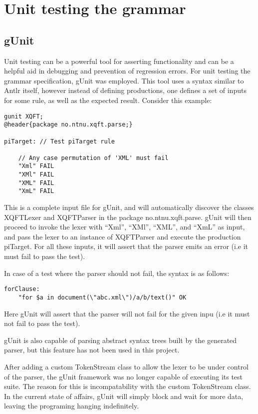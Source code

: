 \section{Unit testing the grammar}
\subsection{gUnit}
Unit testing can be a powerful tool for asserting functionality and can be a
helpful aid in debugging and prevention of regression errors.  For unit testing the
grammar specification, gUnit \cite{gunit00} was employed. This tool uses a
syntax similar to Antlr itself, however instead of defining productions, one
defines a set of inputs for some rule, as well as the expected result. Consider
this example:

\begin{verbatim}
gunit XQFT;
@header{package no.ntnu.xqft.parse;}

piTarget: // Test piTarget rule

    // Any case permutation of 'XML' must fail
    "Xml" FAIL
    "XMl" FAIL
    "XML" FAIL
    "XmL" FAIL
\end{verbatim}

This is a complete input file for gUnit, and will automatically discover the
classes XQFTLexer and XQFTParser in the package no.ntnu.xqft.parse. gUnit will
then proceed to invoke the lexer with ``Xml'', ``XMl'', ``XML'', and ``XmL'' as
input, and pass the lexer to an instance of XQFTParser and execute the production
piTarget. For all these inputs, it will assert that the parser emits an error
(i.e it must fail to pass the test).

In case of a test where the parser should not fail, the syntax is as follows:
\begin{verbatim}
forClause:
	"for $a in document(\"abc.xml\")/a/b/text()" OK
\end{verbatim}
Here gUnit will assert that the parser will not fail for the given inpu (i.e it
must not fail to pass the test).

gUnit is also capable of parsing abstract syntax trees built by the generated
parser, but this feature has not been used in this project.

After adding a custom TokenStream class to allow the lexer to be under control
of the parser, the gUnit framework was no longer capable of executing its test
suite. The reason for this is incompatability with the custom TokenStream class.
In the current state of affairs, gUnit will simply block and wait for more data,
leaving the programing hanging indefinitely. 
